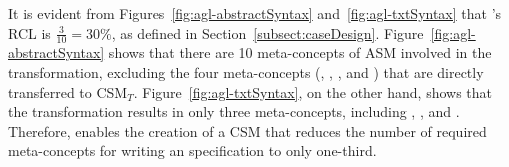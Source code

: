 
It is evident from Figures~\ref{fig:agl-abstractSyntax} and~\ref{fig:agl-txtSyntax} that \agl's RCL is $\frac{3}{10}=30\%$, as defined in Section~\ref{subsect:caseDesign}. Figure~\ref{fig:agl-abstractSyntax} shows that there are 10 meta-concepts of ASM involved in the transformation, excluding the four meta-concepts (, , , and ) that are directly transferred to CSM$_T$. Figure~\ref{fig:agl-txtSyntax}, on the other hand, shows that the transformation results in only three meta-concepts, including , , and . Therefore, \agl enables the creation of a CSM that reduces the number of required meta-concepts for writing an \agl specification to only one-third.


